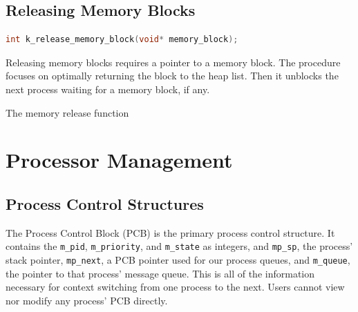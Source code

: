 \documentclass[12pt]{report}
\begin{document}
\subsection{Releasing Memory Blocks}

\begin{minipage}{\textwidth}
\begin{lstlisting}[language=C, frame=single]
int k_release_memory_block(void* memory_block);
\end{lstlisting}
\end{minipage}

Releasing memory blocks requires a pointer to a memory block. The procedure focuses on optimally returning the block to the heap list. Then it unblocks the next process waiting for a memory block, if any.

\begin{algorithm}
  \caption{The memory release function}
  \begin{algorithmic}[1]
	  \EndIf
	  \EndIf
	  \EndIf
	  \EndIf
    \EndProcedure
  \end{algorithmic}
\end{algorithm}

\pagebreak



\section{Processor Management}

\subsection{Process Control Structures}

The Process Control Block (PCB) is the primary process control structure. It
contains the \texttt{m_pid}, \texttt{m_priority}, and \texttt{m_state} as integers, and 
\texttt{mp_sp}, the process' stack pointer, \texttt{mp_next}, a PCB pointer used for our
process queues, and \texttt{m_queue}, the pointer to that process' message queue.
This is all of the information necessary for context switching from one process
to the next. Users cannot view nor modify any process' PCB directly.
\end{document}
